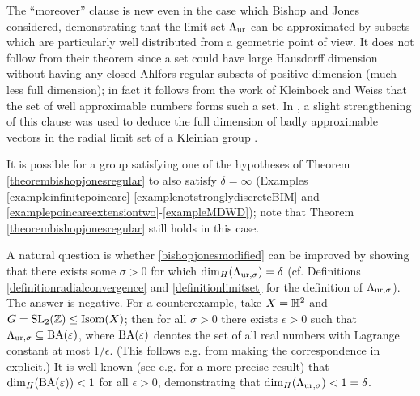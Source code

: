 \begin{remark*}
The ``moreover'' clause is new even in the case which Bishop and Jones considered, demonstrating that the limit set $\Lambda_{\mathrm{ur}}$ can be approximated by subsets which are particularly well distributed from a geometric point of view. It does not follow from their theorem since a set could have large Hausdorff dimension without having any closed Ahlfors regular subsets of positive dimension (much less full dimension); in fact it follows from the work of Kleinbock and Weiss \cite{KleinbockWeiss1} that the set of well approximable numbers forms such a set. In \cite{FSU4}, a slight strengthening of this clause was used to deduce the full dimension of badly approximable vectors in the radial limit set of a Kleinian group \cite[Theorem 9.3]{FSU4}.
\end{remark*}

\begin{remark*}
It is possible for a group satisfying one of the hypotheses of Theorem \ref{theorembishopjonesregular} to also satisfy $\delta = \infty$ (Examples \ref{exampleinfinitepoincare}-\ref{examplenotstronglydiscreteBIM} and \ref{examplepoincareextensiontwo}-\ref{exampleMDWD}); note that Theorem \ref{theorembishopjonesregular} still holds in this case.
\end{remark*}

\begin{remark*}
A natural question is whether \eqref{bishopjonesmodified} can be improved by showing that there exists some $\sigma > 0$ for which ${\dim_H}(\Lambda_{\mathrm{ur},\sigma}) = \delta$ (cf. Definitions \ref{definitionradialconvergence} and \ref{definitionlimitset} for the definition of $\Lambda_{\mathrm{ur},\sigma}$). The answer is negative. For a counterexample, take $X = \H^2$ and $G = \SL_2(\Z)\leq\Isom(X)$; then for all $\sigma > 0$ there exists $\epsilon > 0$ such that $\Lambda_{\mathrm{ur},\sigma}\subseteq\mathrm{BA}(\varepsilon)$, where $\mathrm{BA}(\varepsilon)$ denotes the set of all real numbers with Lagrange constant at most $1/\epsilon$. (This follows e.g. from making the correspondence in \cite[Observation 1.15 and Proposition 1.21]{FSU4} explicit.) It is well-known (see e.g. \cite{Kurzweil} for a more precise result) that ${\dim_H}(\mathrm{BA}(\varepsilon)) < 1$ for all $\epsilon > 0$, demonstrating that ${\dim_H}(\Lambda_{\mathrm{ur},\sigma}) < 1 = \delta$.
\end{remark*}

